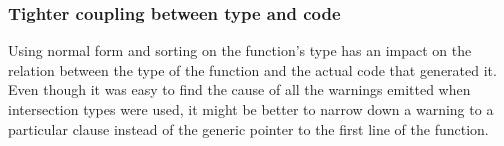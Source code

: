 \subsubsection{Tighter coupling between type and code}

Using normal form and sorting on the function's type has an impact on
the relation between the type of the function and the actual code that
generated it. Even though it was easy to find the cause of all the
warnings emitted when intersection types were used, it might be better
to narrow down a warning to a particular clause instead of the generic
pointer to the first line of the function.
